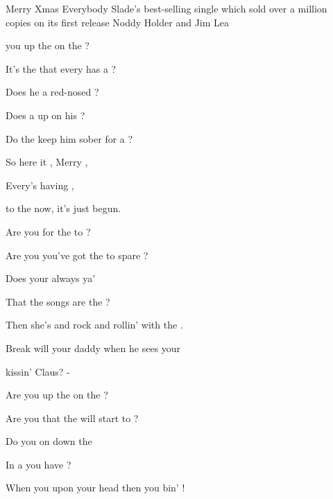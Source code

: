 \begin{SBSong}{Merry Xmas Everybody}
    {Slade's best-selling single which sold over a million copies on its first release}
    {Noddy Holder and Jim Lea}
  \begin{SBVerse}
	 you  up the  on the ?  
	
	It's the  that every  has a ?  
	
	Does he  a red-nosed ?
	
	Does a  up on his ?
	
	Do the  keep him sober for a ?  
  \end{SBVerse}
  
  \begin{SBChorus}
	So here it , Merry ,
	
	Every's having ,
	
	 to the  now, it's  just begun.   
  \end{SBChorus}
  \begin{SBVerse}
	Are you  for the  to ?  
	
	Are you  you've got the  to spare ?  
	
	Does your  always  ya'
	
	That the  songs are the ?
	
	Then she's  and rock and rollin' with the .  
  \end{SBVerse}
  \begin{SBBracket}{Break}
	 will your daddy  when he sees your
	
	 kissin'  Claus? - 
  \end{SBBracket}
  \begin{SBVerse}
	Are you  up the  on the ?  
	
	Are you  that the  will start to ?  
	
	Do you  on down the 
	
	In a  you have ?
	
	When you  upon your head then you bin' !   
  \end{SBVerse}
\end{SBSong}
